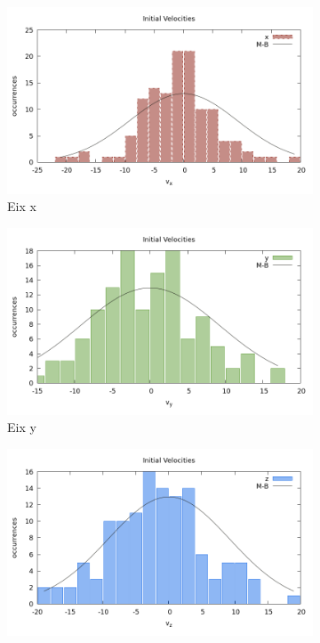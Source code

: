 \documentclass[a4paper,10pt]{article}
\begin{document}
\begin{figure}
	\centering
	\begin{subfigure}{0.45\linewidth}
		\includegraphics[width=\linewidth]{fin_vel_x_verlet}
		\caption{Eix x}
		\label{fig:fin_vel_x_verlet}
	\end{subfigure}
	\begin{subfigure}{0.45\linewidth}
		\includegraphics[width=\linewidth]{fin_vel_y_verlet}
		\caption{Eix y}
		\label{fig:fin_vel_y_verlet}
	\end{subfigure}
	\begin{subfigure}{0.45\linewidth}
		\includegraphics[width=\linewidth]{fin_vel_z_verlet} 

\end{subfigure}
\end{figure}
\end{document}
